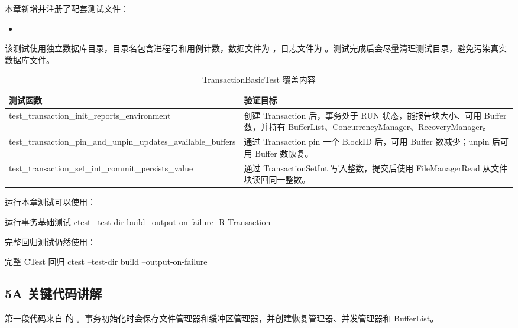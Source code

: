 本章新增并注册了配套测试文件：
\begin{itemize}
  \item {}
\end{itemize}

该测试使用独立数据库目录，目录名包含进程号和用例计数，数据文件为 ，日志文件为 。测试完成后会尽量清理测试目录，避免污染真实数据库文件。

\begin{table}[htbp]
  \centering
  \caption{TransactionBasicTest 覆盖内容}
  \label{tab:tx-tests}
  \begin{tabularx}{\textwidth}{>{\ttfamily}l Y}
    \toprule
    测试函数 & 验证目标 \\
    \midrule
    test\_transaction\_init\_reports\_environment & 创建 Transaction 后，事务处于 RUN 状态，能报告块大小、可用 Buffer 数，并持有 BufferList、ConcurrencyManager、RecoveryManager。\\
    test\_transaction\_pin\_and\_unpin\_updates\_available\_buffers & 通过 Transaction pin 一个 BlockID 后，可用 Buffer 数减少；unpin 后可用 Buffer 数恢复。\\
    test\_transaction\_set\_int\_commit\_persists\_value & 通过 TransactionSetInt 写入整数，提交后使用 FileManagerRead 从文件块读回同一整数。\\
    \bottomrule
  \end{tabularx}
\end{table}

运行本章测试可以使用：

\begin{dbcode}[listing options={language=bash}]{运行事务基础测试}
ctest --test-dir build --output-on-failure -R Transaction
\end{dbcode}

完整回归测试仍然使用：

\begin{dbcode}[listing options={language=bash}]{完整 CTest 回归}
ctest --test-dir build --output-on-failure
\end{dbcode}

\subsection{5A 关键代码讲解}
\label{sec:tx-code}

第一段代码来自  的 。事务初始化时会保存文件管理器和缓冲区管理器，并创建恢复管理器、并发管理器和 BufferList。

